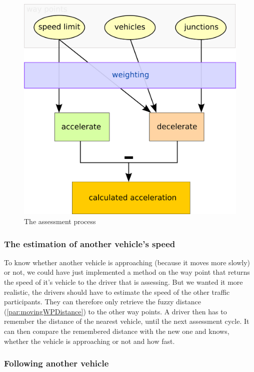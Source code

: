 \begin{figure}[H]
\begin{center}
\includegraphics[width=\textwidth]{images/animus.png}
\end{center}
\caption{The assessment process}
\label{fig:animus}
\end{figure}

\subsubsection{The estimation of another vehicle's speed}

To know whether another vehicle is approaching (because it moves 
more slowly) or not, we could have just implemented a method on the
way point that returns the speed of it's vehicle to the driver that
is assessing. But we wanted it more realistic, the drivers should have
to estimate the speed of the other traffic participants. They can
therefore only retrieve the fuzzy distance (\ref{par:movingWPDistance})
to the other way points. A driver then has to remember the distance
of the nearest vehicle, until the next assessment cycle. It can then
compare the remembered distance with the new one and knows, whether the
vehicle is approaching or not and how fast.

\subsubsection{Following another vehicle}

